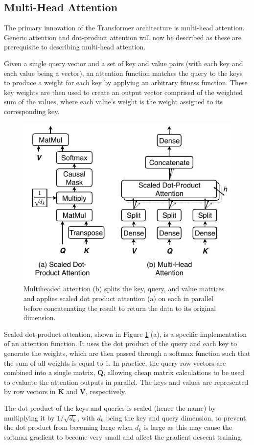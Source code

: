 \subsection{Multi-Head Attention} \label{multihead_attention}
The primary innovation of the Transformer architecture is multi-head attention.
Generic attention and dot-product attention will now be described as these are prerequisite to describing multi-head attention.

Given a single query vector and a set of key and value pairs (with each key and each value being a vector), an attention function matches the query to the keys to produce a weight for each key by applying an arbitrary fitness function.
These key weights are then used to create an output vector comprised of the weighted sum of the values, where each value's weight is the weight assigned to its corresponding key. 

\begin{figure}[htbp]
	\centerline{\includegraphics[width=.35\textwidth]{images/multihead_attn.pdf}}
	\caption{Multiheaded attention (b) splits the key, query, and value matrices and applies scaled dot product attention (a) on each in parallel before concatenating the result to return the data to its original dimension.}
	\label{fig:multihead}
\end{figure}

Scaled dot-product attention, shown in Figure \ref{fig:multihead} (a), is a specific implementation of an attention function. 
It uses the dot product of the query and each key to generate the weights, which are then passed through a softmax function such that the sum of all weights is equal to 1.
In practice, the query row vectors are combined into a single matrix, $\boldsymbol{Q}$, allowing cheap matrix calculations to be used to evaluate the attention outputs in parallel.
The keys and values are represented by row vectors in $\boldsymbol{K}$ and $\boldsymbol{V}$, respectively.

The dot product of the keys and queries is scaled (hence the name) by multiplying it by $1 / \sqrt{d_k}$, with $d_k$ being the key and query dimension, to prevent the dot product from becoming large when $d_k$ is large as this may cause the softmax gradient to become very small and affect the gradient descent training.

